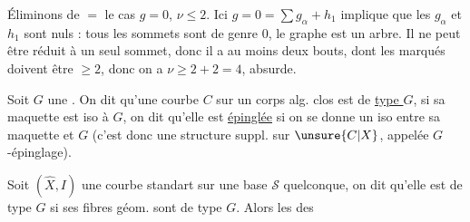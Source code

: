 Éliminons de $=$ le cas $g=0$, $\nu\leq2$. Ici $g=0=\sum g_\alpha+h_1$ implique que les $g_\alpha$ et $h_1$ sont nuls : tous les sommets sont de genre $0$, le graphe est un arbre. Il ne peut être réduit à un seul sommet, donc il a au moins deux bouts, dont les  marqués doivent être $\geq2$, donc  on a $\nu\geq2+2=4$, absurde.

Soit $G$ une . On dit qu'une  courbe  $C$ sur un corps alg. clos est de \uline{type $G$}, si sa maquette est iso à $G$, on dit qu'elle est \uline{épinglée} si on se donne un iso entre sa maquette et $G$ (c'est donc une structure suppl. sur $\unsure{C|X}$, appelée $G$-épinglage).

Soit $(\widehat X,I)$ une courbe standart sur une base $\mathcal S$ quelconque, on dit qu'elle est de type $G$ si ses fibres géom. sont de type $G$. Alors les  des
